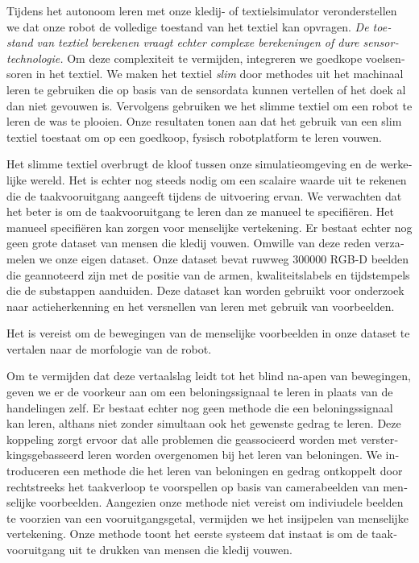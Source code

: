 \documentclass[\home/main.tex]{subfiles}
\begin{document}
\begin{otherlanguage}{dutch}
Tijdens het autonoom leren met onze kledij- of textielsimulator veronderstellen we dat onze robot de volledige toestand van het textiel kan opvragen. \emph{De toestand van textiel berekenen vraagt echter complexe berekeningen of dure sensortechnologie.} Om deze complexiteit te vermijden, integreren we goedkope voelsensoren in het textiel. We maken het textiel \textit{slim} door methodes uit het machinaal leren te gebruiken die op basis van de sensordata kunnen vertellen of het doek al dan niet gevouwen is. Vervolgens gebruiken we het slimme textiel om een robot te leren de was te plooien. Onze resultaten tonen aan dat het gebruik van een slim textiel toestaat om op een goedkoop, fysisch robotplatform te leren vouwen.

Het slimme textiel overbrugt de kloof tussen onze simulatieomgeving en de werkelijke wereld. Het is echter nog steeds nodig om een scalaire waarde uit te rekenen die de taakvooruitgang aangeeft tijdens de uitvoering ervan.
We verwachten dat het beter is om de taakvooruitgang te leren dan ze manueel te specifiëren. Het manueel specifiëren kan zorgen voor menselijke vertekening.  
Er bestaat echter nog geen grote dataset van mensen die kledij vouwen. Omwille van deze reden verzamelen we onze eigen dataset. Onze dataset bevat ruwweg \qty{300000}{} RGB-D beelden die geannoteerd zijn met de positie van de armen, kwaliteitslabels en tijdstempels die de substappen aanduiden. Deze dataset kan worden gebruikt voor onderzoek naar actieherkenning en het versnellen van leren met gebruik van voorbeelden.

Het is vereist om de bewegingen van de menselijke voorbeelden in onze dataset te vertalen naar de morfologie van de robot. 

Om te vermijden dat deze vertaalslag leidt tot het blind na-apen van bewegingen, geven we er de voorkeur aan om een beloningssignaal te leren in plaats van de handelingen zelf.
Er bestaat echter nog geen methode die een beloningssignaal kan leren, althans niet zonder simultaan ook het gewenste gedrag te leren. Deze koppeling zorgt ervoor dat alle problemen die geassocieerd worden met versterkingsgebasseerd leren worden overgenomen bij het leren van beloningen. 
We introduceren een methode die het leren van beloningen en gedrag ontkoppelt door rechtstreeks het taakverloop te voorspellen op basis van camerabeelden van menselijke voorbeelden. Aangezien onze methode niet vereist om indiviudele beelden te voorzien van een vooruitgangsgetal, vermijden we het insijpelen van menselijke vertekening. Onze methode toont het eerste systeem dat instaat is om de taakvooruitgang uit te drukken van mensen die kledij vouwen. 


\end{otherlanguage}
\end{document}
